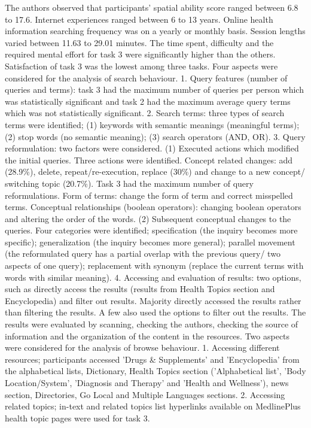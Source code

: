 \documentclass[]{article}
\begin{document}
The authors observed that participants' spatial ability score ranged between 6.8 to 17.6. Internet experiences ranged between 6 to 13 years. Online health information searching frequency was on a yearly or monthly basis. Session lengths varied between 11.63 to 29.01 minutes. The time spent, difficulty and the required mental effort for task 3 were significantly higher than the others. Satisfaction of task 3 was the lowest among three tasks. Four aspects were considered for the analysis of search behaviour. 1. Query features (number of queries and terms): task 3 had the maximum number of queries per person which was statistically significant and task 2 had the maximum average query terms which was not statistically significant. 2. Search terms: three types of search terms were identified; (1) keywords with semantic meanings (meaningful terms); (2) stop words (no semantic meaning); (3) search operators (AND, OR). 3. Query reformulation: two factors were considered. (1) Executed actions which modified the initial queries. Three actions were identified. Concept related changes: add (28.9\%), delete, repeat/re-execution, replace (30\%) and change to a new concept/ switching topic (20.7\%). Task 3 had the maximum number of query reformulations. Form of terms: change the form of term and correct misspelled terms. Conceptual relationships (boolean operators): changing boolean operators and altering the order of the words. (2) Subsequent conceptual changes to the queries. Four categories were identified; specification (the inquiry becomes more specific); generalization (the inquiry becomes more general); parallel movement (the reformulated query has a partial overlap with the previous query/ two aspects of one query); replacement with synonym (replace the current terms with words with similar meaning). 4. Accessing and evaluation of results: two options, such as directly access the results (results from Health Topics section and Encyclopedia) and filter out results. Majority directly accessed the results rather than filtering the results. A few also used the options to filter out the results. The results were evaluated by scanning, checking the authors, checking the source of information and the organization of the content in the resources. Two aspects were considered for the analysis of browse behaviour. 1. Accessing different resources; participants accessed 'Drugs \& Supplements' and 'Encyclopedia' from the alphabetical lists, Dictionary, Health Topics section ('Alphabetical list', 'Body Location/System', 'Diagnosis and Therapy' and 'Health and Wellness'), news section,  Directories, Go Local and Multiple Languages sections. 2. Accessing related topics; in-text and related topics list hyperlinks available on MedlinePlus health topic pages were used for task 3. 
\end{document}
